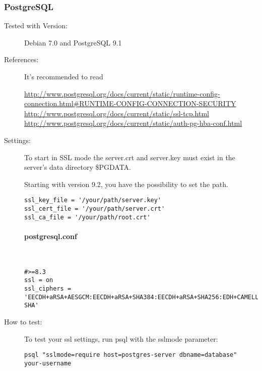 
\subsubsection{PostgreSQL}

\begin{description}
\item[Tested with Version:] Debian 7.0 and PostgreSQL 9.1

\item[References:]

It's recommended to read 

{\small \url{http://www.postgresql.org/docs/current/static/runtime-config-connection.html#RUNTIME-CONFIG-CONNECTION-SECURITY}}
{\small \url{http://www.postgresql.org/docs/current/static/ssl-tcp.html}}
{\small \url{http://www.postgresql.org/docs/current/static/auth-pg-hba-conf.html}}

\item[Settings:] \mbox{}


To start in SSL mode the server.crt and server.key must exist in the server's data directory \$PGDATA. 

Starting with version 9.2, you have the possibility to set the path.

\begin{lstlisting}[breaklines]
ssl_key_file = '/your/path/server.key'
ssl_cert_file = '/your/path/server.crt'
ssl_ca_file = '/your/path/root.crt'
\end{lstlisting}

\paragraph*{postgresql.conf}\mbox{}\\

\begin{lstlisting}[breaklines]
#>=8.3
ssl = on 
ssl_ciphers = 'EECDH+aRSA+AESGCM:EECDH+aRSA+SHA384:EECDH+aRSA+SHA256:EDH+CAMELLIA256:EECDH:EDH+aRSA:+SSLv3:!aNULL:!eNULL:!LOW:!3DES:!MD5:!EXP:!PSK:!SRP:!DSS:!RC4:!SEED:!AES128:!CAMELLIA128:!ECDSA:AES256-SHA'
\end{lstlisting}



\item[How to test:]
To test your ssl settings, run psql with the sslmode parameter:
\begin{lstlisting}[breaklines]
psql "sslmode=require host=postgres-server dbname=database" your-username
\end{lstlisting}

\end{description}


